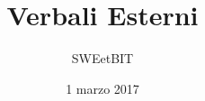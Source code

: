



\title{\textbf{Verbali Esterni}}
\author{SWEetBIT}

\date{1 marzo 2017}




\makeFrontPage

\tableofcontents





